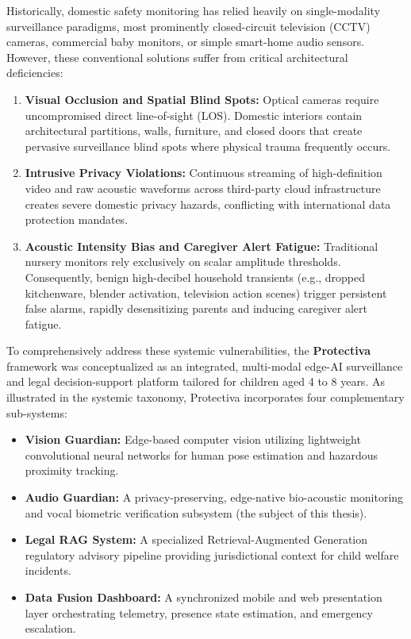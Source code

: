 \documentclass[12pt, a4paper]{report}
\begin{document}
Historically, domestic safety monitoring has relied heavily on single-modality surveillance paradigms, most prominently closed-circuit television (CCTV) cameras, commercial baby monitors, or simple smart-home audio sensors. However, these conventional solutions suffer from critical architectural deficiencies:
\begin{enumerate}
    \item \textbf{Visual Occlusion and Spatial Blind Spots:} Optical cameras require uncompromised direct line-of-sight (LOS). Domestic interiors contain architectural partitions, walls, furniture, and closed doors that create pervasive surveillance blind spots where physical trauma frequently occurs.
    \item \textbf{Intrusive Privacy Violations:} Continuous streaming of high-definition video and raw acoustic waveforms across third-party cloud infrastructure creates severe domestic privacy hazards, conflicting with international data protection mandates.
    \item \textbf{Acoustic Intensity Bias and Caregiver Alert Fatigue:} Traditional nursery monitors rely exclusively on scalar amplitude thresholds. Consequently, benign high-decibel household transients (e.g., dropped kitchenware, blender activation, television action scenes) trigger persistent false alarms, rapidly desensitizing parents and inducing caregiver alert fatigue.
\end{enumerate}

To comprehensively address these systemic vulnerabilities, the \textbf{Protectiva} framework was conceptualized as an integrated, multi-modal edge-AI surveillance and legal decision-support platform tailored for children aged 4 to 8 years. As illustrated in the systemic taxonomy, Protectiva incorporates four complementary sub-systems:
\begin{itemize}
    \item \textbf{Vision Guardian:} Edge-based computer vision utilizing lightweight convolutional neural networks for human pose estimation and hazardous proximity tracking.
    \item \textbf{Audio Guardian:} A privacy-preserving, edge-native bio-acoustic monitoring and vocal biometric verification subsystem (the subject of this thesis).
    \item \textbf{Legal RAG System:} A specialized Retrieval-Augmented Generation regulatory advisory pipeline providing jurisdictional context for child welfare incidents.
    \item \textbf{Data Fusion Dashboard:} A synchronized mobile and web presentation layer orchestrating telemetry, presence state estimation, and emergency escalation.
\end{itemize}
\end{document}

